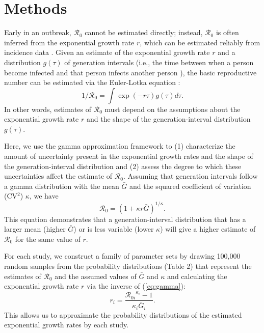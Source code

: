 \documentclass[12pt]{article}
\newcommand{\eref}[1]{(\ref{eq:#1})}
\begin{document}
\section{Methods}

Early in an outbreak, $\mathcal R_0$ cannot be estimated directly;
instead, $\mathcal R_0$ is often inferred from
the exponential growth rate $r$, which can be estimated reliably from incidence data \citep{mills2004transmissibility, nishiura2009transmission, ma2014estimating}.
Given an estimate of the exponential growth rate $r$ and a distribution $g(\tau)$ of
generation intervals (i.e., the time between when a person become 
infected and that person infects another person \citep{svensson2007note}), the basic reproductive
number can be estimated via the Euler-Lotka equation \citep{wallinga2007generation}:
\begin{equation}
1/\mathcal R_0 = \int \exp(-r\tau) g(\tau) d\tau.
\end{equation}
In other words, estimates of $\mathcal R_0$ must
depend on the assumptions about the
exponential growth rate $r$ and the shape of the generation-interval distribution $g(\tau)$.

Here, we use the gamma approximation framework \citep{mcbryde2009early, nishiura2009transmission, roberts2011early, park2019practical} to (1) characterize the amount of uncertainty present in the exponential growth rates and the shape of the generation-interval distribution and (2) assess the degree to which these uncertainties affect the estimate of $\mathcal R_0$.
Assuming that generation intervals follow a gamma distribution
with the mean $\bar G$ and the squared coefficient of variation (CV$^2$) $\kappa$, 
we have
\begin{equation}
\mathcal R_0 = \left(1 + \kappa r \bar{G}\right)^{1/\kappa}.
\label{eq:gamma}
\end{equation}
This equation demonstrates that a generation-interval distribution
that has a larger mean (higher $\bar{G}$) or is less variable (lower $\kappa$)
will give a higher estimate of $\mathcal R_0$ for the same value of $r$.

For each study, we construct a family of parameter sets by drawing 100,000 random samples from the probability distributions (Table 2) that represent the estimates of $\mathcal R_0$ and the assumed values of $\bar G$ and $\kappa$ and calculating the exponential growth rate $r$ via the inverse of \eref{gamma}:
\begin{equation}
r_i = \frac{{\mathcal R_{0i}}^{\kappa_i} - 1}{\kappa_i \bar{G}_i}.
\end{equation}
This allows us to approximate the probability distributions of the estimated exponential growth rates by each study.
\end{document}
